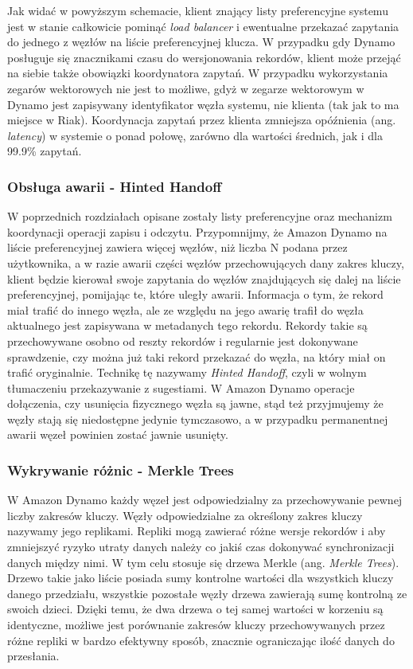 Jak widać w powyższym schemacie, klient znający listy preferencyjne systemu jest w stanie całkowicie pominąć \emph{load balancer} i ewentualne przekazać zapytania do jednego z węzłów na liście preferencyjnej klucza. 
W przypadku gdy Dynamo posługuje się znacznikami czasu do wersjonowania rekordów, klient może przejąć na siebie także obowiązki koordynatora zapytań.
W przypadku wykorzystania zegarów wektorowych nie jest to możliwe, gdyż w zegarze wektorowym w Dynamo jest zapisywany identyfikator węzła systemu, nie klienta (tak jak to ma miejsce w Riak).
Koordynacja zapytań przez klienta zmniejsza opóźnienia (ang. \emph{latency}) w systemie o ponad połowę, zarówno dla wartości średnich, jak i dla 99.9\% zapytań.

\subsubsection*{Obsługa awarii - Hinted Handoff}
\label{sec:dynamo-hinted-handoff}

W poprzednich rozdziałach opisane zostały listy preferencyjne oraz mechanizm koordynacji operacji zapisu i odczytu.
Przypomnijmy, że Amazon Dynamo na liście preferencyjnej zawiera więcej węzłów, niż liczba N podana przez użytkownika, a w razie awarii części węzłów przechowujących dany zakres kluczy, klient będzie kierował swoje zapytania do węzłów znajdujących się dalej na liście preferencyjnej, pomijając te, które uległy awarii.
Informacja o tym, że rekord miał trafić do innego węzła, ale ze względu na jego awarię trafił do węzła aktualnego jest zapisywana w metadanych tego rekordu.
Rekordy takie są przechowywane osobno od reszty rekordów i regularnie jest dokonywane sprawdzenie, czy można już taki rekord przekazać do węzła, na który miał on trafić oryginalnie.
Technikę tę nazywamy \emph{Hinted Handoff}, czyli w wolnym tłumaczeniu przekazywanie z sugestiami.
W Amazon Dynamo operacje dołączenia, czy usunięcia fizycznego węzła są jawne, stąd też przyjmujemy że węzły stają się niedostępne jedynie tymczasowo, a w przypadku permanentnej awarii węzeł powinien zostać jawnie usunięty.

\subsubsection*{Wykrywanie różnic - Merkle Trees}
\label{merkle-trees}

W Amazon Dynamo każdy węzeł jest odpowiedzialny za przechowywanie pewnej liczby zakresów kluczy.
Węzły odpowiedzialne za określony zakres kluczy nazywamy jego replikami.
Repliki mogą zawierać różne wersje rekordów i aby zmniejszyć ryzyko utraty danych należy co jakiś czas dokonywać synchronizacji danych między nimi.
W tym celu stosuje się drzewa Merkle (ang. \emph{Merkle Trees}).
Drzewo takie jako liście posiada sumy kontrolne wartości dla wszystkich kluczy danego przedziału, wszystkie pozostałe węzły drzewa zawierają sumę kontrolną ze swoich dzieci.
Dzięki temu, że dwa drzewa o tej samej wartości w korzeniu są identyczne, możliwe jest porównanie zakresów kluczy przechowywanych przez różne repliki w bardzo efektywny sposób, znacznie ograniczając ilość danych do przesłania.

